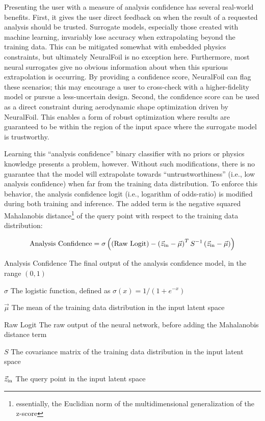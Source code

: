     Presenting the user with a measure of analysis confidence has several real-world benefits. First, it gives the user direct feedback on when the result of a requested analysis should be trusted. Surrogate models, especially those created with machine learning, invariably lose accuracy when extrapolating beyond the training data. This can be mitigated somewhat with embedded physics constraints, but ultimately NeuralFoil is no exception here. Furthermore, most neural surrogates give no obvious information about when this spurious extrapolation is occurring. By providing a confidence score, NeuralFoil can flag these scenarios; this may encourage a user to cross-check with a higher-fidelity model or pursue a less-uncertain design. Second, the confidence score can be used as a direct constraint during aerodynamic shape optimization driven by NeuralFoil. This enables a form of robust optimization where results are guaranteed to be within the region of the input space where the surrogate model is trustworthy.

    Learning this ``analysis confidence'' binary classifier with no priors or physics knowledge presents a problem, however. Without such modifications, there is no guarantee that the model will extrapolate towards ``untrustworthiness'' (i.e., low analysis confidence) when far from the training data distribution. To enforce this behavior, the analysis confidence logit (i.e., logarithm of odds-ratio) is modified during both training and inference. The added term is the negative squared Mahalanobis distance\footnote{essentially, the Euclidian norm of the multidimensional generalization of the z-score} of the query point with respect to the training data distribution:

    \begin{equation}
        \text{Analysis Confidence} = \sigma
        \left(
        \left(\text{Raw Logit}\right) -
        \left( \vec{z}_{\rm in} - \vec\mu \right) ^ T
        S ^{-1}
        \left( \vec{z}_{\rm in} - \vec\mu \right)
        \right)
        \label{eq:uq}
    \end{equation}

    \begin{eqexpl}[30mm]
        \item{Analysis Confidence} The final output of the analysis confidence model, in the range $(0, 1)$
        \item{$\sigma$} The logistic function, defined as $\sigma(x) = 1 / (1 + e^{-x})$
        \item{$\vec\mu$} The mean of the training data distribution in the input latent space
        \item{Raw Logit} The raw output of the neural network, before adding the Mahalanobis distance term
        \item{$S$} The covariance matrix of the training data distribution in the input latent space
        \item{$\vec{z}_{\rm in}$} The query point in the input latent space
    \end{eqexpl}

